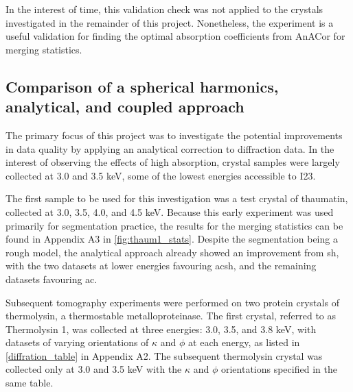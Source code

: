
In the interest of time, this validation check was not applied to the crystals investigated in the remainder of this project. Nonetheless, the experiment is a useful validation for finding the optimal absorption coefficients from AnACor for merging statistics. %


\subsection{Comparison of a spherical harmonics, analytical, and coupled approach} %
The primary focus of this project was to investigate the potential improvements in data quality by applying an analytical correction to diffraction data.
In the interest of observing the effects of high absorption, crystal samples were largely collected at 3.0 and 3.5 \unit{keV}, some of the lowest energies accessible to I23.

The first sample to be used for this investigation was a test crystal of thaumatin, collected at 3.0, 3.5, 4.0, and 4.5 \unit{keV}. Because this early experiment was used primarily for segmentation practice, the results for the merging statistics can be found in Appendix A3 in \cref{fig:thaum1_stats}. Despite the segmentation being a rough model, the analytical approach already showed an improvement from \ac{sh}, with the two datasets at lower energies favouring \ac{acsh}, and the remaining datasets favouring \ac{ac}.

Subsequent tomography experiments were performed on two protein crystals of thermolysin, a thermostable metalloproteinase. The first crystal, referred to as Thermolysin 1, was collected at three energies: 3.0, 3.5, and 3.8 \unit{keV}, with datasets of varying orientations of $\kappa$ and $\phi$ at each energy, as listed in \cref{diffration_table} in Appendix A2. The subsequent thermolysin crystal was collected only at 3.0 and 3.5 \unit{keV} with the $\kappa$ and $\phi$ orientations specified in the same table.

